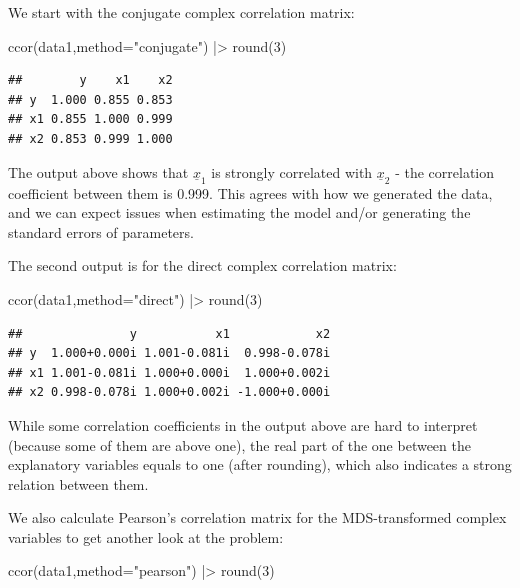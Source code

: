 \documentclass[
]{book}
\newenvironment{Shaded}{\begin{snugshade}}{\end{snugshade}}
\newcommand{\AttributeTok}[1]{\textcolor[rgb]{0.77,0.63,0.00}{#1}}
\newcommand{\DecValTok}[1]{\textcolor[rgb]{0.00,0.00,0.81}{#1}}
\newcommand{\FunctionTok}[1]{\textcolor[rgb]{0.00,0.00,0.00}{#1}}
\newcommand{\NormalTok}[1]{#1}
\newcommand{\SpecialCharTok}[1]{\textcolor[rgb]{0.00,0.00,0.00}{#1}}
\newcommand{\StringTok}[1]{\textcolor[rgb]{0.31,0.60,0.02}{#1}}
\begin{document}
We start with the conjugate complex correlation matrix:

\begin{Shaded}
\begin{Highlighting}[]
\FunctionTok{ccor}\NormalTok{(data1,}\AttributeTok{method=}\StringTok{"conjugate"}\NormalTok{) }\SpecialCharTok{|\textgreater{}} \FunctionTok{round}\NormalTok{(}\DecValTok{3}\NormalTok{)}
\end{Highlighting}
\end{Shaded}

\begin{verbatim}
##        y    x1    x2
## y  1.000 0.855 0.853
## x1 0.855 1.000 0.999
## x2 0.853 0.999 1.000
\end{verbatim}

The output above shows that \(\underline{x}_{1}\) is strongly correlated with \(\underline{x}_{2}\) - the correlation coefficient between them is 0.999. This agrees with how we generated the data, and we can expect issues when estimating the model and/or generating the standard errors of parameters.

The second output is for the direct complex correlation matrix:

\begin{Shaded}
\begin{Highlighting}[]
\FunctionTok{ccor}\NormalTok{(data1,}\AttributeTok{method=}\StringTok{"direct"}\NormalTok{) }\SpecialCharTok{|\textgreater{}} \FunctionTok{round}\NormalTok{(}\DecValTok{3}\NormalTok{)}
\end{Highlighting}
\end{Shaded}

\begin{verbatim}
##               y           x1            x2
## y  1.000+0.000i 1.001-0.081i  0.998-0.078i
## x1 1.001-0.081i 1.000+0.000i  1.000+0.002i
## x2 0.998-0.078i 1.000+0.002i -1.000+0.000i
\end{verbatim}

While some correlation coefficients in the output above are hard to interpret (because some of them are above one), the real part of the one between the explanatory variables equals to one (after rounding), which also indicates a strong relation between them.

We also calculate Pearson's correlation matrix for the MDS-transformed complex variables to get another look at the problem:

\begin{Shaded}
\begin{Highlighting}[]
\FunctionTok{ccor}\NormalTok{(data1,}\AttributeTok{method=}\StringTok{"pearson"}\NormalTok{) }\SpecialCharTok{|\textgreater{}} \FunctionTok{round}\NormalTok{(}\DecValTok{3}\NormalTok{)}
\end{Highlighting}
\end{Shaded}
\end{document}
